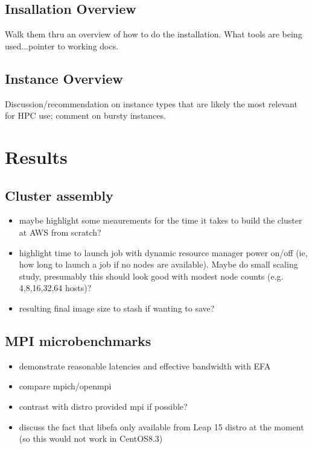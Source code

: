 \documentclass[sigconf,screen]{acmart}
\begin{document}
\subsection{Insallation Overview}
Walk them thru an overview of how to do the installation. What tools are being
used...pointer to working docs.

\subsection{Instance Overview}

Discussion/recommendation on instance types that are likely the most relevant
for HPC use; comment on bursty instances.

\lipsum[4]

\section{Results}
\lipsum[6]
\subsection{Cluster assembly}
\begin{itemize}
\item maybe highlight some meaurements for the time it takes to build the
  cluster at AWS from scratch?
\item highlight time to launch job with dynamic resource manager power on/off
  (ie, how long to launch a job if no nodes are available). Maybe do small
  scaling study, presumably this should look good with modest node counts
  (e.g. 4,8,16,32,64 hosts)?
\item resulting final image size to stash if wanting to save?
\end{itemize}

\subsection{MPI microbenchmarks}
\begin {itemize}
\item demonstrate reasonable latencies and effective bandwidth with EFA
\item compare mpich/openmpi
\item contrast with distro provided mpi if possible?
\item discuss the fact that libefa only available from Leap 15 distro at the
  moment (so this would not work in CentOS8.3)
\end{itemize}
\end{document}
